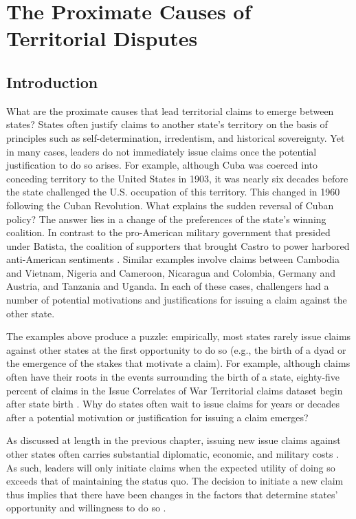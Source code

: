 
\chapter{The Proximate Causes of Territorial Disputes}
\pagebreak

\section{Introduction}


What are the proximate causes that lead territorial claims to emerge between states? States often justify claims to another state’s territory on the basis of principles such as self-determination, irredentism, and historical sovereignty. Yet in many cases, leaders do not immediately issue claims once the potential justification to do so arises. For example, although Cuba was coerced into conceding territory to the United States in 1903, it was nearly six decades before the state challenged the U.S. occupation of this territory. This changed in 1960 following the Cuban Revolution. What explains the sudden reversal of Cuban policy? The answer lies in a change of the preferences of the state’s winning coalition. In contrast to the pro-American military government that presided under Batista, the coalition of supporters that brought Castro to power harbored anti-American sentiments \citep{morley1982, wright2000}. Similar examples involve claims between Cambodia and Vietnam, Nigeria and Cameroon, Nicaragua and Colombia, Germany and Austria, and Tanzania and Uganda. In each of these cases, challengers had a number of potential motivations and justifications for issuing a claim against the other state. 


The examples above produce a puzzle: empirically, most states rarely issue claims against other states at the first opportunity to do so (e.g., the birth of a dyad or the emergence of the stakes that motivate a claim). For example, although claims often have their roots in the events surrounding the birth of a state, eighty-five percent of claims in the Issue Correlates of War Territorial claims dataset begin after state birth \citep{frederick2017}. Why do states often wait to issue claims for years or decades after a potential motivation or justification for issuing a claim emerges?

As discussed at length in the previous chapter, issuing new issue claims against other states often carries substantial diplomatic, economic, and military costs \citep[e.g.,][]{akcinaroglu2014, diez2006, fravel2008, gibler2012, goertz2016, lee2012, pressman2008, simmons2005, vasquez2001, vasquez2009}. As such, leaders will only initiate claims when the expected utility of doing so exceeds that of maintaining the status quo. The decision to initiate a new claim thus implies that there have been changes in the factors that determine states’ opportunity and willingness to do so \citep{most1989}. 

